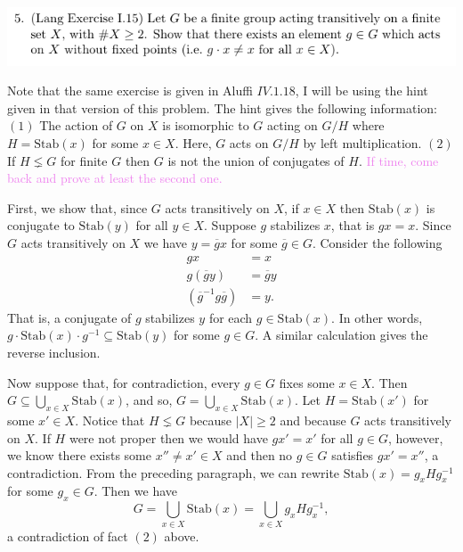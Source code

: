 \documentclass[12pt,letterpaper,boxed]{hmcpset}
\newcommand{\wg}[1]{\textcolor{violet}{#1}}
\newcommand{\abs}[1]{\left|#1\right|}
\newcommand{\inv}{^{-1}}
\begin{document}
\newpage



\begin{problem}
	\includegraphics[scale=0.8]{5.png}
	\hfill
\end{problem}

\begin{solution}
Note that the same exercise is given in Aluffi $IV.1.18$, I will be
using the hint given in that version of this problem.
The hint gives the following information: $(1)$ The action of $G$ on $X$ is
isomorphic to $G$ acting on $G/H$ where $H = \text{Stab}(x)$ for some
$x \in X$. Here, $G$ acts on $G/H$ by left multiplication. $(2)$ If $H
\lneq G$ for finite $G$ then $G$ is not the union of conjugates of
$H$. \wg{If time, come back
and prove at least the second one.}

First, we show that, since $G$ acts transitively on $X$,
if $x \in X$ then $\text{Stab}(x)$ is conjugate to
$\text{Stab}(y)$ for all $y \in X$. 
Suppose $g$ stabilizes $x$, that is $gx = x$. Since $G$ acts
transitively on $X$ we have $y = \overline g x$ for some $\overline g
\in G$. Consider the following
\begin{align*}
	g x &= x \\
	g(\overline g y) &= \overline g y \\
	(\overline g\inv g \overline g) &= y.
\end{align*}
That is, a conjugate of $g$ stabilizes $y$ for each $g \in
\text{Stab}(x)$. In other words, $g \cdot \text{Stab}(x) \cdot g\inv \subseteq
\text{Stab}(y)$ for some $g \in G$. A similar calculation gives the
reverse inclusion.

Now suppose that, for contradiction, every $g \in G$ fixes some $x \in
X$. Then $G \subseteq \bigcup_{x \in X} \text{Stab}(x)$, and so, 
$G = \bigcup_{x \in X} \text{Stab}(x)$. Let $H = \text{Stab}(x')$ for
some $x' \in X$. Notice that $H \lneq G$ because $\abs{X} \geq 2$ and
because $G$ acts transitively on $X$.
If $H$ were not proper then we would have $g x' = x'$ for all $g \in G$, however, we
know there exists some $x'' \neq x' \in X$ and then no $g \in G$ 
satisfies $g x' = x''$, a contradiction. 
From the preceding paragraph, we can rewrite $\text{Stab}(x) = g_x H g_x\inv$ for some $g_x
\in G$. Then we have \[
G = \bigcup_{x \in X} \text{Stab}(x) = \bigcup_{x \in X} g_x H
g_x\inv, 
\]
a contradiction of fact $(2)$ above. 




\end{solution}
\end{document}
